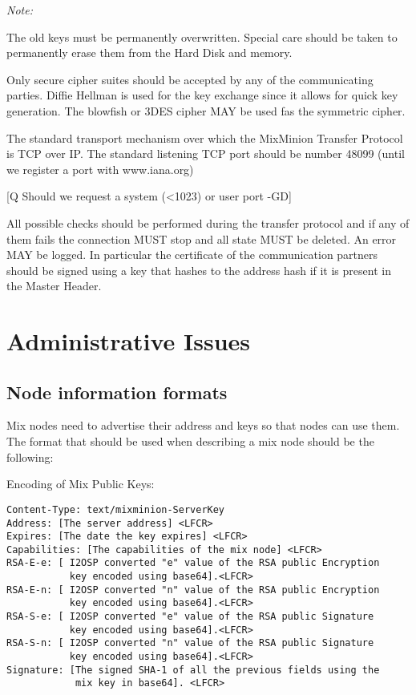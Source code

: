 \documentclass{article}
\begin{document}
\emph{Note:}

The old keys must be permanently overwritten. Special care should be
taken to permanently erase them from the Hard Disk and memory. 

Only secure cipher suites should be accepted by any of the
communicating parties. Diffie Hellman is used for the key exchange
since it allows for quick key generation. The blowfish or 3DES cipher
MAY be used fas the symmetric cipher.

The standard transport mechanism over which the MixMinion Transfer
Protocol is TCP over IP. The standard listening TCP port should be 
number 48099 (until we register a port with www.iana.org)

[Q Should we request a system (<1023) or user port -GD]

All possible checks should be performed during the transfer protocol
and if any of them fails the connection MUST stop and all state MUST
be deleted. An error MAY be logged. In particular the certificate of
the communication partners should be signed using a key that hashes to
the address hash if it is present in the Master Header.

\section{Administrative Issues}

\subsection{Node information formats}

Mix nodes need to advertise their address and keys so that nodes can
use them. The format that should be used when describing a mix node
should be the following:

Encoding of Mix Public Keys:

\begin{verbatim}
Content-Type: text/mixminion-ServerKey
Address: [The server address] <LFCR>
Expires: [The date the key expires] <LFCR>
Capabilities: [The capabilities of the mix node] <LFCR>
RSA-E-e: [ I2OSP converted "e" value of the RSA public Encryption 
           key encoded using base64].<LFCR>
RSA-E-n: [ I2OSP converted "n" value of the RSA public Encryption 
           key encoded using base64].<LFCR>
RSA-S-e: [ I2OSP converted "e" value of the RSA public Signature 
           key encoded using base64].<LFCR>
RSA-S-n: [ I2OSP converted "n" value of the RSA public Signature 
           key encoded using base64].<LFCR>
Signature: [The signed SHA-1 of all the previous fields using the 
            mix key in base64]. <LFCR>
\end{verbatim}
\end{document}
